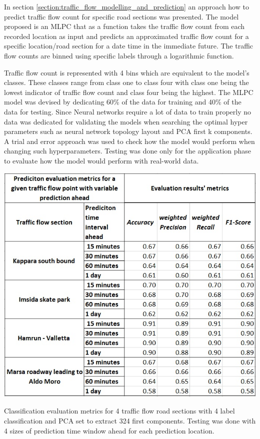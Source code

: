 \documentclass[12pt, a4paper]{report}
\theoremstyle{definition}
\theoremstyle{definition}%
\theoremstyle{definition}%
\theoremstyle{definition}%
\theoremstyle{definition}%
\theoremstyle{definition}%
\begin{document}
In section \ref{section:traffic_flow_modelling_and_prediction} an approach how to predict traffic flow count for specific road sections was presented. The model proposed is an MLPC that as a function takes the traffic flow count from each recorded location as input and predicts an approximated traffic flow count for a specific location/road section for a date time in the immediate future. The traffic flow counts are binned using specific labels through a logarithmic function. 

Traffic flow count is represented with 4 bins which are equivalent to the model's classes. These classes range from class one to class four with class one being the lowest indicator of traffic flow count and class four being the highest. The MLPC model was devised by dedicating 60\% of the data for training and 40\% of the data for testing. Since Neural networks require a lot of data to train properly no data was dedicated for validating the models when searching the optimal hyper  parameters such as neural network topology layout and PCA first k components. A trial and error approach was used to check how the model would perform when changing such hyperparameters. Testing was done only for the application phase to evaluate how the model would perform with real-world data. 

\begin{table}[t!]	
	\includegraphics[scale=0.75]{classification_metrics_result.jpg}
	\centering
	\caption[Classification evaluation metrics for traffic flow prediction]{Classification evaluation metrics for 4 traffic flow road sections with 4 label classification and PCA set to extract 324 first components. Testing was done with 4 sizes of prediction time window ahead for each prediction location.}
	\label{table:classification_mertrics}
\end{table}
\end{document}
